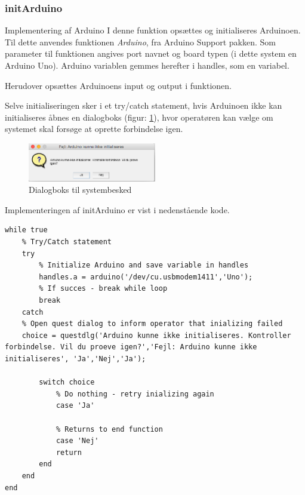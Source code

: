 \subsubsection{initArduino}
Implementering af Arduino
I denne funktion opsættes og initialiseres Arduinoen. Til dette anvendes funktionen \textit{Arduino}, fra Arduino Support pakken. Som parameter til funktionen angives port navnet og board typen (i dette system en Arduino Uno). Arduino variablen gemmes herefter i handles, som en variabel.

Herudover opsættes Arduinoens input og output i funktionen. 

Selve initialiseringen sker i et try/catch statement, hvis Arduinoen ikke kan initialiseres åbnes en dialogboks (figur: \ref{fig:initArduino}), hvor operatøren kan vælge om systemet skal forsøge at oprette forbindelse igen. 

\begin{figure}[H]
	\centering
	\includegraphics[width=0.5\textwidth]{billeder/software/initArduino.png}
	\caption{Dialogboks til systembesked}
	\label{fig:initArduino}
\end{figure}

Implementeringen af initArduino er vist i nedenstående kode.
\begin{lstlisting} 
while true
    % Try/Catch statement
    try
        % Initialize Arduino and save variable in handles
        handles.a = arduino('/dev/cu.usbmodem1411','Uno');
        % If succes - break while loop
        break
    catch
    % Open quest dialog to inform operator that inializing failed    
    choice = questdlg('Arduino kunne ikke initialiseres. Kontroller forbindelse. Vil du proeve igen?','Fejl: Arduino kunne ikke initialiseres', 'Ja','Nej','Ja');

        switch choice
            % Do nothing - retry inializing again
            case 'Ja'
        
            % Returns to end function
            case 'Nej'
            return
        end
    end
end
\end{lstlisting} 
